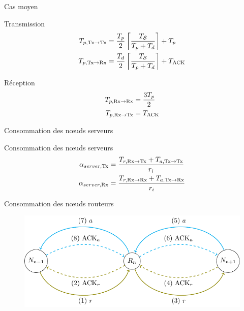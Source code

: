 \begin{frame}{Cas moyen}
    \begin{alertblock}{Transmission}
    \begin{align}
      T_{p, \textrm{Tx} \to \textrm{Tx}} &=  \frac{T_{p}}{2} \left\lceil \frac{T_{\mathcal{S}}}{T_{p} + T_{d}}\right\rceil + T_{p} \\
      T_{p, \textrm{Tx} \to \textrm{Rx}} &= \frac{T_{d}}{2} \left \lceil \dfrac{T_{\mathcal{S}}}{T_{p} + T_{d}} \right \rceil + T_{\textrm{ACK}}
    \end{align}
  \end{alertblock}

  \begin{alertblock}{Réception}
    \begin{align*}
      T_{p, \textrm{Rx} \to \textrm{Rx}} &= \frac{3 T_{p}}{2}\\
      T_{p, \textrm{Rx} \to \textrm{Tx}} &= T_{\textrm{ACK}}
    \end{align*}
  \end{alertblock}

\end{frame}

\begin{frame}{Consommation des nœuds serveurs}

  \begin{alertblock}{Consommation des nœuds serveurs}
    \begin{align}
      \alpha_{server, \textrm{Tx}} &= \frac{T_{r, \textrm{Rx} \to \textrm{Tx}} + T_{a, \textrm{Tx} \to \textrm{Tx}}}{r_i}
      \label{contikimac:eq:coap_tx} \\
      \alpha_{server, \textrm{Rx}} &= \frac{T_{r, \textrm{Rx} \to \textrm{Rx}} + T_{a, \textrm{Tx} \to \textrm{Rx}}}{r_i}
      \label{contikimac:eq:coap_rx}
    \end{align}
  \end{alertblock}

\end{frame}

\begin{frame}{Consommation des nœuds routeurs}
  \begin{figure}
    \centering
    \includegraphics[scale=1]{figures/conso_routeur_slides.pdf}
  \end{figure}
\end{frame}

